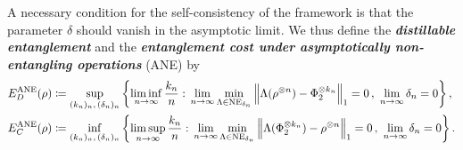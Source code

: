 \documentclass[11pt,notitlepage,tightenlines,nofootinbib,superscriptaddress]{revtex4-1}
\newcommand{\deff}[1]{\textbf{\emph{#1}}}
\begin{document}
A necessary condition for the self-consistency of the framework is that the parameter $\delta$ should vanish in the asymptotic limit. We thus define the \deff{distillable entanglement} and the \deff{entanglement cost under asymptotically non-entangling operations} (ANE) by
\begin{align}
E_D^{\mathrm{ANE}}(\rho) &\coloneqq \sup_{(k_n)_n,\, (\delta_n)_n} \left\{ \liminf_{n\to\infty} \frac{k_n}{n}:\, \lim_{n\to\infty} \min_{\Lambda\in \mathrm{NE}_{\delta_n}} \left\|\Lambda(\rho^{\otimes n}) - \Phi_2^{\otimes k_n} \right\|_1 = 0\, ,\ \lim_{n\to\infty} \delta_n = 0\right\} , \label{distillable_ANE} \\
E_C^{\mathrm{ANE}}(\rho) &\coloneqq \inf_{(k_n)_n,\, (\delta_n)_n} \left\{ \limsup_{n\to\infty} \frac{k_n}{n}:\, \lim_{n\to\infty} \min_{\Lambda\in \mathrm{NE}_{\delta_n}} \left\|\Lambda(\Phi_2^{\otimes k_n}) - \rho^{\otimes n} \right\|_1 = 0\, ,\ \lim_{n\to\infty} \delta_n = 0\right\} . \label{cost_ANE}
\end{align}
\end{document}

